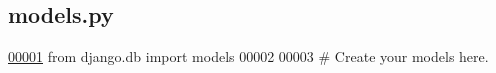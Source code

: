 \hypertarget{Building_2models_8py_source}{}\subsection{models.\+py}
\label{Building_2models_8py_source}

\begin{DoxyCode}
\hypertarget{Building_2models_8py_source_l00001}{}\hyperlink{namespaceBuilding_1_1models}{00001} \textcolor{keyword}{from} django.db \textcolor{keyword}{import} models
00002 
00003 \textcolor{comment}{# Create your models here.}
\end{DoxyCode}
